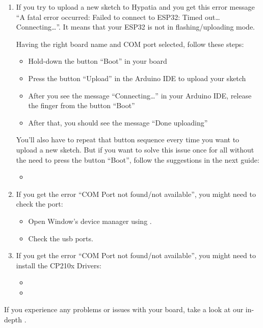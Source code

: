 \begin{enumerate}
  \item If you try to upload a new sketch to Hypatia and you get this error message ``A fatal error occurred: Failed to connect to ESP32: Timed out\ldots Connecting\ldots''. It means that your ESP32 is not in flashing/uploading mode.

  \bigskip
  
  Having the right board name and COM port selected, follow these steps:
  
  \begin{itemize}
    \item Hold-down the button ``Boot'' in your board
    \item Press the button ``Upload'' in the Arduino IDE to upload your sketch
    \item After you see the  message ``Connecting\ldots'' in your Arduino IDE, release the finger from the button ``Boot''
    \item After that, you should see the message ``Done uploading''
  \end{itemize}


  \medskip
  
  You'll also have to repeat that button sequence every time you want to upload a new sketch. But if you want to solve this issue once for all without the need to press the button ``Boot'', follow the suggestions in the next guide:

  \begin{itemize}
    \item {}
  \end{itemize}

  \item  If you get the error ``COM Port not found/not available'', you might need to check the port:

    \begin{itemize}
      \item Open Window's device manager using  .
      \item Check the usb ports.
     \end{itemize}

  \item  If you get the error ``COM Port not found/not available'', you might need to install the CP210x Drivers:

  \begin{itemize}
    \item {}
    \item {}
  \end{itemize}

\end{enumerate}


If you experience any problems or issues with your board, take a look at our in-depth .

